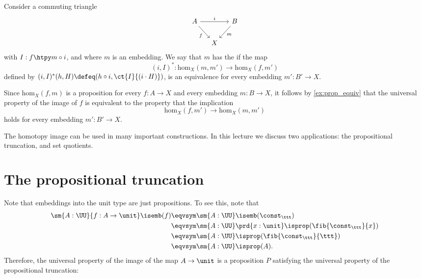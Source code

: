 \begin{defn}
Consider a commuting triangle
\begin{equation*}
\begin{tikzcd}[column sep=small]
A \arrow[rr,"i"] \arrow[dr,swap,"f"] & & B \arrow[dl,"m"] \\
& X
\end{tikzcd}
\end{equation*}
with $I:f\htpy m\circ i$, and where $m$ is an embedding.
We say that $m$ has the  if the map
\begin{equation*}
(i,I)^\ast : \mathrm{hom}_X(m,m')\to\mathrm{hom}_X(f,m')
\end{equation*}
defined by $(i,I)^\ast(h,H)\defeq (h\circ i,\ct{I}{(i\cdot H)})$,
is an equivalence for every embedding $m':B'\to X$. 
\end{defn}

\begin{rmk}
Since $\mathrm{hom}_X(f,m)$ is a proposition for every $f:A\to X$ and every embedding $m:B\to X$, it follows by \cref{ex:prop_equiv} that the universal property of the image of $f$ is equivalent to the property that the implication
\begin{equation*}
\mathrm{hom}_X(f,m')\to\mathrm{hom}_X(m,m')
\end{equation*}
holds for every embedding $m':B'\to X$. 
\end{rmk}

The homotopy image can be used in many important constructions. In this lecture we discuss two applications: the propositional truncation, and set quotients.

\section{The propositional truncation}
Note that embeddings into the unit type are just propositions. To see this, note that
\begin{align*}
\sm{A:\UU}{f:A\to\unit}\isemb(f)
& \eqvsym \sm{A:\UU}\isemb(\const_\ttt) \\
& \eqvsym \sm{A:\UU}\prd{x:\unit}\isprop(\fib{\const_\ttt}{x}) \\
& \eqvsym \sm{A:\UU}\isprop(\fib{\const_\ttt}{\ttt}) \\
& \eqvsym \sm{A:\UU}\isprop(A).
\end{align*}
Therefore, the universal property of the image of the map $A\to\unit$ is a proposition $P$ satisfying the universal property of the propositional truncation:

